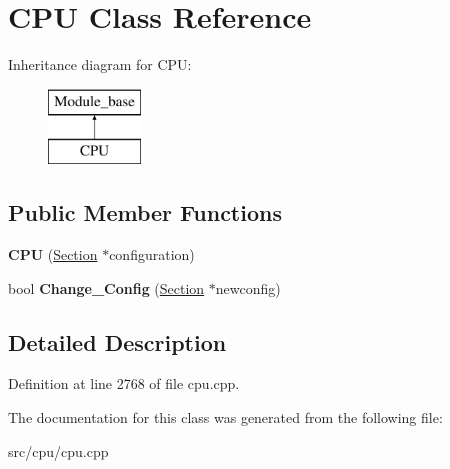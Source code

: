 \hypertarget{classCPU}{\section{C\-P\-U Class Reference}
\label{classCPU}
}
Inheritance diagram for C\-P\-U\-:\begin{figure}[H]
\begin{center}
\leavevmode
\includegraphics[height=2.000000cm]{classCPU}
\end{center}
\end{figure}
\subsection*{Public Member Functions}
\begin{DoxyCompactItemize}
\item 
\hypertarget{classCPU_a7ff8bd1e2634ffa09329984eb00fb890}{{\bfseries C\-P\-U} (\hyperlink{classSection}{Section} $\ast$configuration)}\label{classCPU_a7ff8bd1e2634ffa09329984eb00fb890}

\item 
\hypertarget{classCPU_a84dcaf3dac834731a61c49cacc77f910}{bool {\bfseries Change\-\_\-\-Config} (\hyperlink{classSection}{Section} $\ast$newconfig)}\label{classCPU_a84dcaf3dac834731a61c49cacc77f910}

\end{DoxyCompactItemize}


\subsection{Detailed Description}


Definition at line 2768 of file cpu.\-cpp.



The documentation for this class was generated from the following file\-:\begin{DoxyCompactItemize}
\item 
src/cpu/cpu.\-cpp\end{DoxyCompactItemize}

